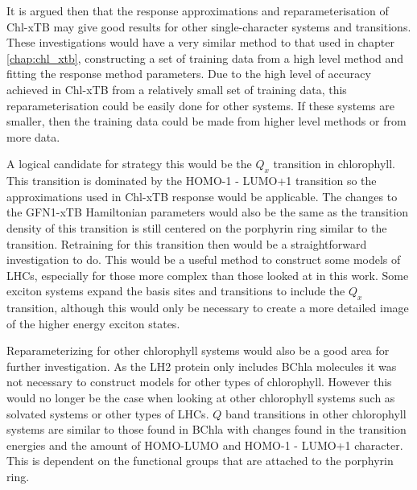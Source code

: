 It is argued then that the response approximations and reparameterisation of Chl-xTB
may give good results for other single-character systems and transitions. These 
investigations would have a very similar method to that used in chapter \ref{chap:chl_xtb},
constructing a set of training data from a high level method and fitting the response
method parameters. Due to the high level of accuracy achieved in Chl-xTB from a
relatively small set of training data, this reparameterisation could be easily done
for other systems. If these systems are smaller, then the training data could be
made from higher level methods or from more data. 

A logical candidate for strategy this would be the $Q_x$ transition in chlorophyll.
This transition is dominated by the HOMO-1 - LUMO+1 transition so the approximations
used in Chl-xTB response would be applicable. The changes to the GFN1-xTB Hamiltonian
parameters would also be the same as the transition density of this transition is
still centered on the porphyrin ring similar to the \Qy transition. Retraining for
this transition then would be a straightforward investigation to do. This would 
be a useful method to construct some models of LHCs, especially for those more complex
than those looked at in this work. Some exciton systems expand the basis sites and
transitions to include the $Q_x$ transition, although this would only be necessary
to create a more detailed image of the higher energy exciton states.

Reparameterizing for other chlorophyll systems would also be a good area for further
investigation. As the LH2 protein only includes BChla molecules it was not necessary
to construct models for other types of chlorophyll. However this would no longer 
be the case when looking at other chlorophyll systems such as solvated systems or
other types of LHCs. $Q$ band transitions in other chlorophyll systems are similar
to those found in BChla with changes found in the transition energies and the amount
of HOMO-LUMO and HOMO-1 - LUMO+1 character. This is dependent on the functional 
groups that are attached to the porphyrin ring.

